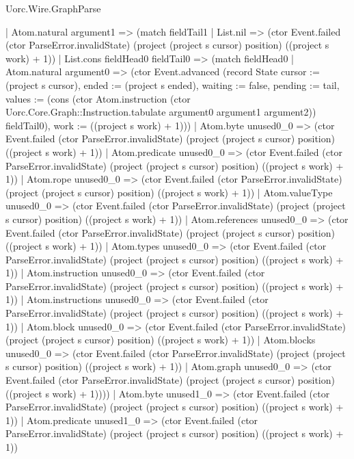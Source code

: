 \begin{lexlean}{Uorc.Wire.GraphParse}
\begin{semanticmodule}
{              | Atom.natural argument1 => (match fieldTail1
                | List.nil => (ctor Event.failed (ctor ParseError.invalidState) (project (project s cursor) position) ((project s work) + 1))
                | List.cons fieldHead0 fieldTail0 => (match fieldHead0
                  | Atom.natural argument0 => (ctor Event.advanced (record State {cursor := (project s cursor), ended := (project s ended), waiting := false, pending := tail, values := (cons (ctor Atom.instruction (ctor Uorc.Core.Graph::Instruction.tabulate argument0 argument1 argument2)) fieldTail0), work := ((project s work) + 1)}))
                  | Atom.byte unused0_0 => (ctor Event.failed (ctor ParseError.invalidState) (project (project s cursor) position) ((project s work) + 1))
                  | Atom.predicate unused0_0 => (ctor Event.failed (ctor ParseError.invalidState) (project (project s cursor) position) ((project s work) + 1))
                  | Atom.rope unused0_0 => (ctor Event.failed (ctor ParseError.invalidState) (project (project s cursor) position) ((project s work) + 1))
                  | Atom.valueType unused0_0 => (ctor Event.failed (ctor ParseError.invalidState) (project (project s cursor) position) ((project s work) + 1))
                  | Atom.references unused0_0 => (ctor Event.failed (ctor ParseError.invalidState) (project (project s cursor) position) ((project s work) + 1))
                  | Atom.types unused0_0 => (ctor Event.failed (ctor ParseError.invalidState) (project (project s cursor) position) ((project s work) + 1))
                  | Atom.instruction unused0_0 => (ctor Event.failed (ctor ParseError.invalidState) (project (project s cursor) position) ((project s work) + 1))
                  | Atom.instructions unused0_0 => (ctor Event.failed (ctor ParseError.invalidState) (project (project s cursor) position) ((project s work) + 1))
                  | Atom.block unused0_0 => (ctor Event.failed (ctor ParseError.invalidState) (project (project s cursor) position) ((project s work) + 1))
                  | Atom.blocks unused0_0 => (ctor Event.failed (ctor ParseError.invalidState) (project (project s cursor) position) ((project s work) + 1))
                  | Atom.graph unused0_0 => (ctor Event.failed (ctor ParseError.invalidState) (project (project s cursor) position) ((project s work) + 1))))
              | Atom.byte unused1_0 => (ctor Event.failed (ctor ParseError.invalidState) (project (project s cursor) position) ((project s work) + 1))
              | Atom.predicate unused1_0 => (ctor Event.failed (ctor ParseError.invalidState) (project (project s cursor) position) ((project s work) + 1))
}
\end{semanticmodule}
\end{lexlean}
